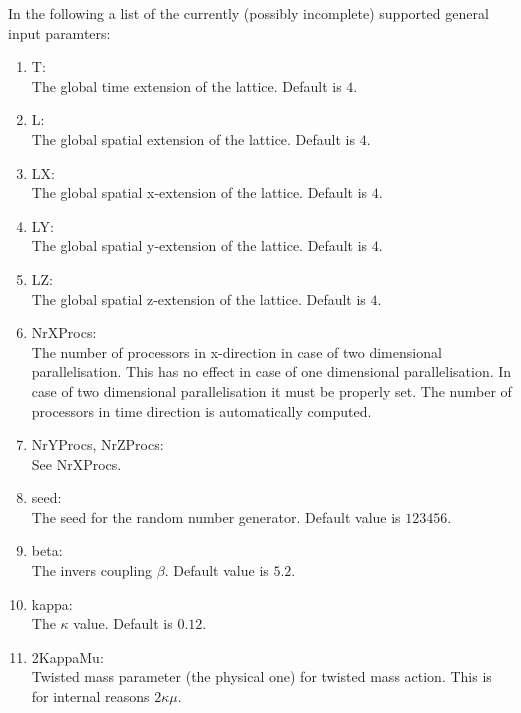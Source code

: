 In the following a list of the currently (possibly incomplete)
supported general input paramters: 
\begin{enumerate}
\item {\ttfamily T}:\\
  The global time extension of the lattice. Default is $4$.

\item {\ttfamily L}:\\
  The global spatial extension of the lattice. Default is $4$.

\item {\ttfamily LX}:\\
  The global spatial x-extension of the lattice. Default is $4$.

\item {\ttfamily LY}:\\
  The global spatial y-extension of the lattice. Default is $4$.

\item {\ttfamily LZ}:\\
  The global spatial z-extension of the lattice. Default is $4$.

\item {\ttfamily NrXProcs}:\\
  The number of processors in x-direction in case of two dimensional
  parallelisation. This has no effect in case of one dimensional
  parallelisation. In case of two dimensional parallelisation it must
  be properly set. The number of processors in time direction is
  automatically computed.

\item {\ttfamily NrYProcs, NrZProcs}:\\
  See {\ttfamily NrXProcs}.

\item {\ttfamily seed}:\\
  The seed for the random number generator. Default value is $123456$.

\item {\ttfamily beta}:\\
  The invers coupling $\beta$. Default value is $5.2$.

\item {\ttfamily kappa}:\\
  The $\kappa$ value. Default is $0.12$.

\item {\ttfamily 2KappaMu}:\\
  Twisted mass parameter (the physical one) for twisted mass
  action. This is for internal reasons $2\kappa\mu$.


\end{enumerate}
